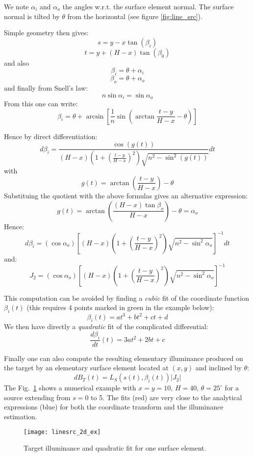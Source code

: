 We note $\alpha_i$ and $\alpha_o$ the
angles w.r.t. the surface element normal. The surface normal is tilted
by $\theta$ from the horizontal (see figure \ref{fig:line_src}).

Simple geometry then gives:
\[ s = y - x\tan(\beta_i) \]
\[ t = y + (H-x)\tan(\beta_0) \]
and also
\[\beta_i = \theta + \alpha_i \]
\[\beta_o = \theta + \alpha_o \]
and finally from Snell's law:
\[ n \sin\alpha_i = \sin\alpha_o \]
From this one can write:
\[ \beta_i = \theta + \arcsin\left[ \frac{1}{n} 
		\sin(\arctan\frac{t-y}{H-x} - \theta)
 \right]\]

Hence by direct differentiation:
\[ d\beta_i = \frac{\cos(g(t)) }
{ (H-x) \left( 1+(\frac{t-y}{H-x})^2 \right) \sqrt{n^2 - \sin^2(g(t))}} dt\]
with 
\[ g(t) = \arctan\left(\frac{t-y}{H-x}\right) - \theta\]
Substituing the quotient with the above formulas gives an alternative
expression:
\[ g(t) = \arctan\left(\frac{(H-x)\tan\beta_o}{H-x}\right) - \theta = \alpha_o\]
Hence:
\[ d\beta_i = (\cos \alpha_o)
\left[ (H-x) \left( 1+(\frac{t-y}{H-x})^2 \right) \sqrt{n^2 - 
\sin^2 \alpha_o} \right]^{-1} dt\]
and:
\[ J_2 = (\cos \alpha_o)
\left[ (H-x) \left( 1+(\frac{t-y}{H-x})^2 \right) \sqrt{n^2 - 
\sin^2 \alpha_o} \right]^{-1} \]


This computation can be avoided by finding a \emph{cubic} 
fit of the coordinate function 
$\beta_i(t)$ (this
requires 4 points marked in green in the example below):
\[ \beta_i(t) = at^3+bt^2+ct +d \]
We then have directly
a \emph{quadratic} fit of the complicated differential:
\[\frac{d\beta_i}{dt}(t) = 3at^2+2bt + c \]

Finally one can also compute the resulting elementary illuminance
produced on the target by an elementary surface element
located at $(x,y)$ and inclined by $\theta$:
\[ dB_T(t) = L_S(s(t), \beta_i(t)) |J_2| \]
The Fig.~\ref{fig:irr_one_element} shows a numerical example with $x = y = 10$, 
$H = 40$, $\theta=25^\circ$ for a source extending from $s=0$ 
to 5.
The fits (red) are very close to the analytical expressions (blue) for both
the coordinate transform and the illuminance estimation.

\begin{figure}
\centering
\texttt{[image: linesrc\_2d\_ex]} 
\caption{Target illuminance and quadratic fit for one surface
element.}
\label{fig:irr_one_element}
\end{figure}

